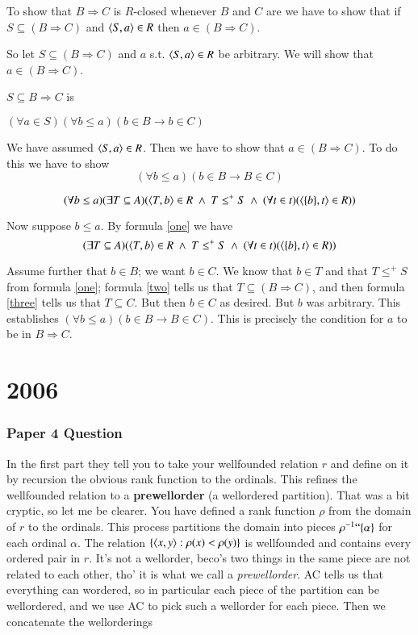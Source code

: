 \documentclass{book}
\begin{document}
\smallskip
 
To show that $B\Rightarrow  C$ is $R$-closed whenever $B$ and $C$ are we 
have to show that if $S \subseteq (B \Rightarrow C)$ and $\mbox{$\langle S,a \rangle$} \in R$ 
then $a \in (B \Rightarrow C)$.

\smallskip

So let $S \subseteq (B \Rightarrow C)$ and $a$ s.t. $\mbox{$\langle S,a \rangle$} \in R$ be 
arbitrary.   We will show that $a \in (B \Rightarrow C)$.

\smallskip

$S \subseteq B \Rightarrow C$ is 

$(\forall a \in S)(\forall b \leq a)(b \in B \to b \in C)$

We have assumed  $\mbox{$\langle S,a \rangle$} \in R$.  Then we have to show that 
$a \in (B \Rightarrow C)$.  To do this we have to show 
$$(\forall b \leq a)(b \in B \to B \in C)$$

\begin{equation}\label{one}
(\forall b \leq a)(\exists T \subseteq A)(\mbox{$\langle T,b \rangle$} \in R\ \wedge\ T \leq^+ S\ \wedge\ (\forall t \in t)(\mbox{$\langle \{b\},t \rangle$} \in R))\end{equation}


Now suppose $b \leq a$.  By formula \ref{one} we have
$$(\exists T \subseteq A)(\tuple{T,b} \in R\ \wedge\ T \leq^+ S\ \wedge\
(\forall t \in t)(\tuple{\{b\},t} \in R))$$

Assume further that $b \in B$; we want $b \in C$.  We know that $b \in
T$ and that $T \leq^+ S$ from formula \ref{one}; formula \ref{two}
tells us that $T \subseteq (B \Rightarrow C)$, and then formula \ref{three}
tells us that $T \subseteq C$.  But then $b \in C$ as desired.  But
$b$ was arbitrary.  This establishes $(\forall b \leq a)(b \in B \to B
\in C)$.  This is precisely the condition for $a$ to be in $B \Rightarrow C$.

\chapter{2006}

\subsection*{Paper 4 Question}

In the first part they tell you to take your wellfounded relation $r$
and define on it by recursion the obvious rank function to the
ordinals.  This refines the wellfounded relation to a {\bf
  prewellorder} (a wellordered partition). That was a bit cryptic, so
let me be clearer. You have defined a rank function $\rho$ from the
domain of $r$ to the ordinals.  This process partitions the domain
into pieces $\rho^{-1}``\{\alpha\}$ for each ordinal $\alpha$. The
relation $\{\mbox{$\langle x,y \rangle$}: \rho(x)< \rho(y)\}$ is wellfounded and
contains every ordered pair in $r$.  It's not a wellorder, beco's two
things in the same piece are not related to each other, tho' it is
what we call a {\sl prewellorder}.  AC tells us that everything can
wordered, so in particular each piece of the partition can be
wellordered, and we use AC to pick such a wellorder for each
piece. Then we concatenate the wellorderings
\end{document}
